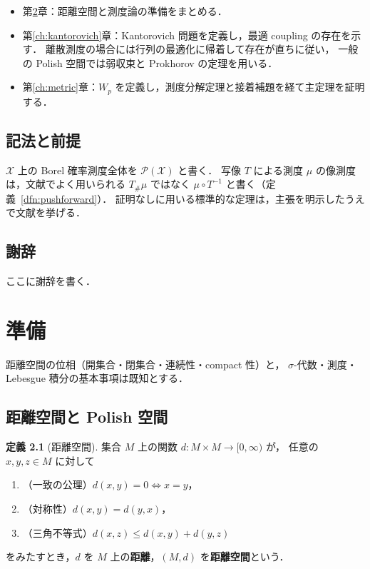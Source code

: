 \documentclass[12pt,a4j,twoside]{jreport}
\numberwithin{equation}{chapter}
\theoremstyle{definition} %
\newtheorem{dfn}[thm]{定義}
\newcommand{\X}{\mathcal{X}}
\newcommand{\Prob}{\mathcal{P}}
\newcommand{\Wass}{W}
\begin{document}
\begin{itemize}
  \item 第\ref{ch:prelim}章：距離空間と測度論の準備をまとめる．
  \item 第\ref{ch:kantorovich}章：Kantorovich 問題を定義し，最適 coupling の存在を示す．
    離散測度の場合には行列の最適化に帰着して存在が直ちに従い，
    一般の Polish 空間では弱収束と Prokhorov の定理を用いる．
  \item 第\ref{ch:metric}章：$\Wass_p$ を定義し，測度分解定理と接着補題を経て主定理を証明する．
\end{itemize}

\section{記法と前提}

$\X$ 上の Borel 確率測度全体を $\Prob(\X)$ と書く．
写像 $T$ による測度 $\mu$ の像測度は，文献でよく用いられる $T_\#\mu$ ではなく
$\mu\circ T^{-1}$ と書く（定義~\ref{dfn:pushforward}）．
証明なしに用いる標準的な定理は，主張を明示したうえで文献を挙げる．

\section*{謝辞}
ここに謝辞を書く．


\chapter{準備}
\label{ch:prelim}

距離空間の位相（開集合・閉集合・連続性・compact 性）と，
$\sigma$-代数・測度・Lebesgue 積分の基本事項は既知とする．

\section{距離空間と Polish 空間}

\begin{dfn}[距離空間]\label{dfn:metric}
  集合 $M$ 上の関数 $d\colon M\times M\to[0,\infty)$ が，
  任意の $x,y,z\in M$ に対して
  \begin{enumerate}
    \item （一致の公理）$d(x,y)=0\iff x=y$，
    \item （対称性）$d(x,y)=d(y,x)$，
    \item （三角不等式）$d(x,z)\leq d(x,y)+d(y,z)$
  \end{enumerate}
  をみたすとき，$d$ を $M$ 上の\textbf{距離}，$(M,d)$ を\textbf{距離空間}という．
\end{dfn}
\end{document}
